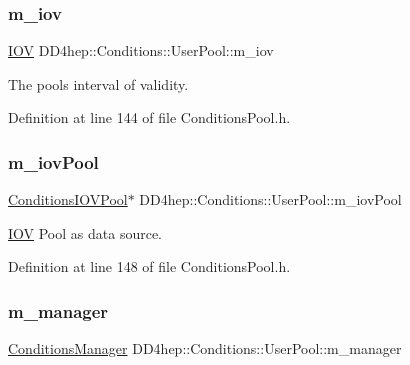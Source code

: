 \subsubsection{\texorpdfstring{m\+\_\+iov}{m\_iov}}
{\footnotesize\ttfamily \hyperlink{class_d_d4hep_1_1_i_o_v}{I\+OV} D\+D4hep\+::\+Conditions\+::\+User\+Pool\+::m\+\_\+iov\hspace{0.3cm}{\ttfamily [protected]}}



The pool\textquotesingle{}s interval of validity. 



Definition at line 144 of file Conditions\+Pool.\+h.

\hypertarget{class_d_d4hep_1_1_conditions_1_1_user_pool_a916051bc20a354a8c603be0bf0c54cac}{}\label{class_d_d4hep_1_1_conditions_1_1_user_pool_a916051bc20a354a8c603be0bf0c54cac} 
\subsubsection{\texorpdfstring{m\+\_\+iov\+Pool}{m\_iovPool}}
{\footnotesize\ttfamily \hyperlink{class_d_d4hep_1_1_conditions_1_1_conditions_i_o_v_pool}{Conditions\+I\+O\+V\+Pool}$\ast$ D\+D4hep\+::\+Conditions\+::\+User\+Pool\+::m\+\_\+iov\+Pool\hspace{0.3cm}{\ttfamily [protected]}}



\hyperlink{class_d_d4hep_1_1_i_o_v}{I\+OV} Pool as data source. 



Definition at line 148 of file Conditions\+Pool.\+h.

\hypertarget{class_d_d4hep_1_1_conditions_1_1_user_pool_a92b13c15de8a8982e6ff8e4f5d24566a}{}\label{class_d_d4hep_1_1_conditions_1_1_user_pool_a92b13c15de8a8982e6ff8e4f5d24566a} 
\subsubsection{\texorpdfstring{m\+\_\+manager}{m\_manager}}
{\footnotesize\ttfamily \hyperlink{class_d_d4hep_1_1_conditions_1_1_conditions_manager}{Conditions\+Manager} D\+D4hep\+::\+Conditions\+::\+User\+Pool\+::m\+\_\+manager\hspace{0.3cm}{\ttfamily [protected]}}



